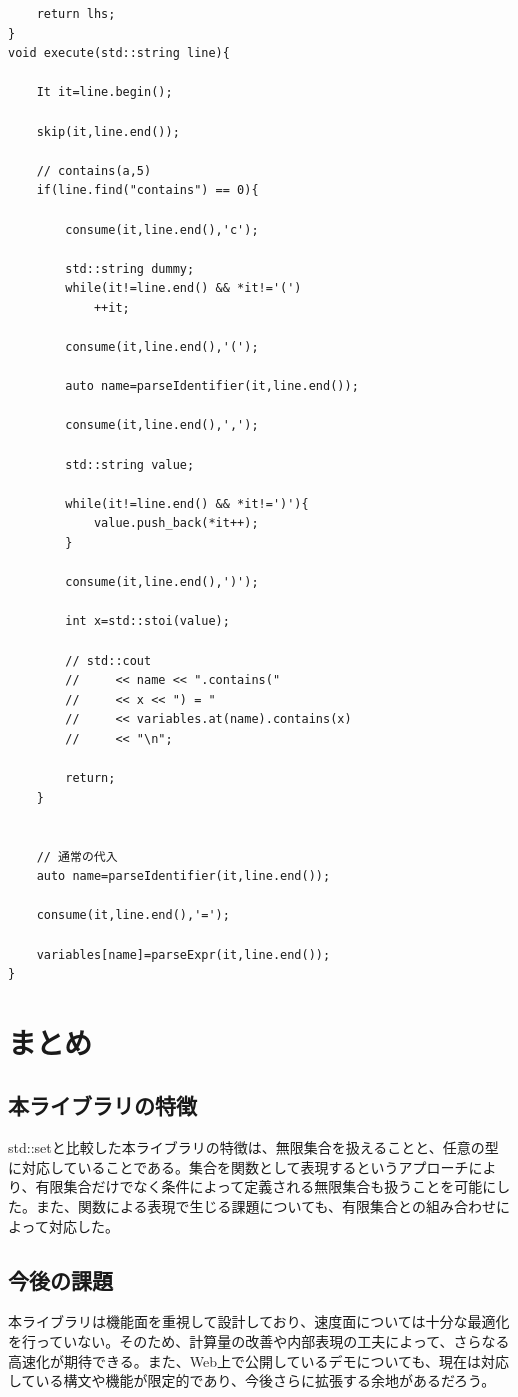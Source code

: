 \documentclass[a4paper,11pt]{ltjsarticle}
\begin{document}
\begin{lstlisting}
    return lhs;
}
void execute(std::string line){

    It it=line.begin();

    skip(it,line.end());

    // contains(a,5)
    if(line.find("contains") == 0){

        consume(it,line.end(),'c');

        std::string dummy;
        while(it!=line.end() && *it!='(')
            ++it;

        consume(it,line.end(),'(');

        auto name=parseIdentifier(it,line.end());

        consume(it,line.end(),',');

        std::string value;

        while(it!=line.end() && *it!=')'){
            value.push_back(*it++);
        }

        consume(it,line.end(),')');

        int x=std::stoi(value);

        // std::cout
        //     << name << ".contains("
        //     << x << ") = "
        //     << variables.at(name).contains(x)
        //     << "\n";

        return;
    }


    // 通常の代入
    auto name=parseIdentifier(it,line.end());

    consume(it,line.end(),'=');

    variables[name]=parseExpr(it,line.end());
}
\end{lstlisting}
\newpage

\section{まとめ}
\subsection{本ライブラリの特徴}
std::setと比較した本ライブラリの特徴は、無限集合を扱えることと、任意の型に対応していることである。集合を関数として表現するというアプローチにより、有限集合だけでなく条件によって定義される無限集合も扱うことを可能にした。また、関数による表現で生じる課題についても、有限集合との組み合わせによって対応した。
\subsection{今後の課題}
本ライブラリは機能面を重視して設計しており、速度面については十分な最適化を行っていない。そのため、計算量の改善や内部表現の工夫によって、さらなる高速化が期待できる。また、Web上で公開しているデモについても、現在は対応している構文や機能が限定的であり、今後さらに拡張する余地があるだろう。
\end{document}
